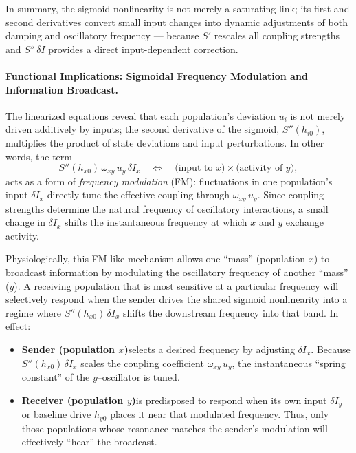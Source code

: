 In summary, the sigmoid nonlinearity is not merely a saturating link; its first and second derivatives convert small input changes into dynamic adjustments of both damping and oscillatory frequency --- because $S'$ rescales all coupling strengths and $S''\,\delta I$ provides a direct input-dependent correction.


\paragraph{Functional Implications: Sigmoidal Frequency Modulation and Information Broadcast.}

The linearized equations
reveal that each population’s deviation \(u_i\) is not merely driven additively by inputs; the second derivative of the sigmoid, \(S''(h_{i0})\), multiplies the product of state deviations and input perturbations.  In other words, the term
\[
S''(h_{x0})\,\omega_{xy}\,u_y\,\delta I_x
\quad\Longleftrightarrow\quad
\text{(input to \(x\))} \times \text{(activity of \(y\))},
\]
acts as a form of \emph{frequency modulation} (FM): fluctuations in one population’s input \(\delta I_x\) directly tune the effective coupling through \(\omega_{xy}\,u_y\).  Since coupling strengths determine the natural frequency of oscillatory interactions, a small change in \(\delta I_x\) shifts the instantaneous frequency at which \(x\) and \(y\) exchange activity.

Physiologically, this FM-like mechanism allows one ``mass'' (population \(x\)) to broadcast information by modulating the oscillatory frequency of another ``mass'' (\(y\)).  A receiving population that is most sensitive at a particular frequency will selectively respond when the sender drives the shared sigmoid nonlinearity into a regime where \(S''(h_{x0})\,\delta I_x\) shifts the downstream frequency into that band.  In effect:
\begin{itemize}
  \item \textbf{Sender (population \(x\))}\enspace selects a desired frequency by adjusting \(\delta I_x\).  Because \(S''(h_{x0})\,\delta I_x\) scales the coupling coefficient \(\omega_{xy}\,u_y\), the instantaneous ``spring constant'' of the \(y\)–oscillator is tuned.
  \item \textbf{Receiver (population \(y\))}\enspace is predisposed to respond when its own input \(\delta I_y\) or baseline drive \(h_{y0}\) places it near that modulated frequency.  Thus, only those populations whose resonance matches the sender’s modulation will effectively ``hear'' the broadcast.
\end{itemize}

